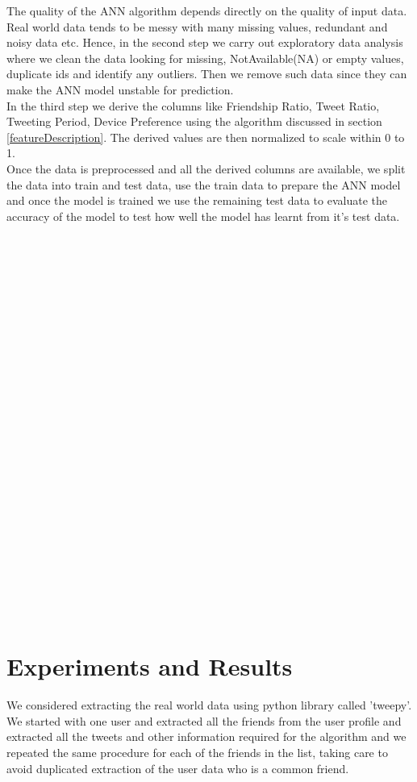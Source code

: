 \documentclass[conference]{IEEEtran}
\begin{document}
The quality of the ANN algorithm depends directly on the quality of input data. Real world data tends to be messy with many missing values, redundant and noisy data etc. Hence, in the second step we carry out exploratory data analysis where we clean the data looking for missing, NotAvailable(NA) or empty values, duplicate ids and identify any outliers. Then we remove such data since they can make the ANN model unstable for prediction.\\

In the third step we derive the columns like Friendship Ratio, Tweet Ratio, Tweeting Period, Device Preference using the algorithm discussed in section \ref{featureDescription}. The derived values are then normalized to scale within 0 to 1. \\

Once the data is preprocessed and all the derived columns are available, we split the data into train and test data, use the train data to prepare the ANN model and once the model is trained we use the remaining test data to evaluate the accuracy of the model to test how well the model has learnt from it's test data. \\\\\\\\\\\\\\\\\\\\\\\\\\\\\\\\\\\\\\\\\\\\\\\\\\\\
 
\section{Experiments and Results}
  	We considered extracting the real world data using python library called 'tweepy'. We started with one user and extracted all the friends from the user profile and extracted all the tweets and other information required for the algorithm and we repeated the same procedure for each of the friends in the list, taking care to avoid duplicated extraction of the user data who is a common friend. \\
 
\end{document}
